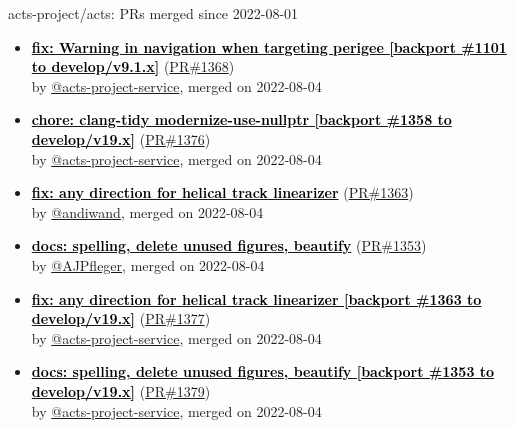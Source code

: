 \documentclass{beamer}
\begin{document}
\begin{frame}[allowframebreaks]{ acts-project/acts: PRs merged since 2022-08-01 }
\begin{itemize}
    \item
    \textbf{\href{https://github.com/acts-project/acts/pull/1368}{\textcolor{black}{fix: Warning in navigation when targeting perigee [backport \#1101 to develop/v9.1.x]}}}
    (\href{https://github.com/acts-project/acts/pull/1368}{PR\#1368}) \\
    by \href{https://github.com/acts-project-service}{ @acts-project-service}, merged on 2022-08-04

    \item
    \textbf{\href{https://github.com/acts-project/acts/pull/1376}{\textcolor{black}{chore: clang-tidy modernize-use-nullptr [backport \#1358 to develop/v19.x]}}}
    (\href{https://github.com/acts-project/acts/pull/1376}{PR\#1376}) \\
    by \href{https://github.com/acts-project-service}{ @acts-project-service}, merged on 2022-08-04

    \item
    \textbf{\href{https://github.com/acts-project/acts/pull/1363}{\textcolor{black}{fix: any direction for helical track linearizer}}}
    (\href{https://github.com/acts-project/acts/pull/1363}{PR\#1363}) \\
    by \href{https://github.com/andiwand}{ @andiwand}, merged on 2022-08-04

    \item
    \textbf{\href{https://github.com/acts-project/acts/pull/1353}{\textcolor{black}{docs: spelling, delete unused figures, beautify}}}
    (\href{https://github.com/acts-project/acts/pull/1353}{PR\#1353}) \\
    by \href{https://github.com/AJPfleger}{ @AJPfleger}, merged on 2022-08-04

    \item
    \textbf{\href{https://github.com/acts-project/acts/pull/1377}{\textcolor{black}{fix: any direction for helical track linearizer [backport \#1363 to develop/v19.x]}}}
    (\href{https://github.com/acts-project/acts/pull/1377}{PR\#1377}) \\
    by \href{https://github.com/acts-project-service}{ @acts-project-service}, merged on 2022-08-04

    \item
    \textbf{\href{https://github.com/acts-project/acts/pull/1379}{\textcolor{black}{docs: spelling, delete unused figures, beautify [backport \#1353 to develop/v19.x]}}}
    (\href{https://github.com/acts-project/acts/pull/1379}{PR\#1379}) \\
    by \href{https://github.com/acts-project-service}{ @acts-project-service}, merged on 2022-08-04


\end{itemize}
\end{frame}
\end{document}
